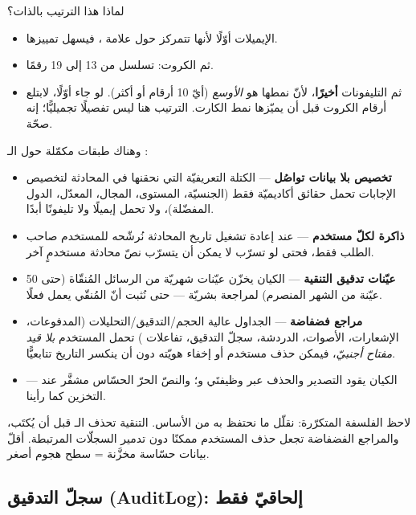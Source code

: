 لماذا هذا الترتيب بالذات؟
\begin{itemize}
\item الإيميلات أوّلًا لأنها تتمركز حول علامة ، فيسهل تمييزها.
\item ثم الكروت: تسلسل من 13 إلى 19 رقمًا.
\item ثم التليفونات \textbf{أخيرًا}، لأنّ نمطها هو \emph{الأوسع} (أيّ 10 أرقام أو
  أكثر). لو جاء أوّلًا، لابتلع أرقام الكروت قبل أن يميّزها نمط الكارت. الترتيب هنا
  ليس تفصيلًا تجميليًّا؛ إنه صحّة.
\end{itemize}

وهناك طبقات مكمّلة حول الـ :
\begin{itemize}
\item \textbf{تخصيص بلا بيانات تواصُل} — الكتلة التعريفيّة التي نحقنها في المحادثة
  لتخصيص الإجابات تحمل حقائق أكاديميّة فقط (الجنسيّة، المستوى، المجال، المعدّل، الدول
  المفضّلة)، ولا تحمل إيميلًا ولا تليفونًا أبدًا.
\item \textbf{ذاكرة  لكلّ مستخدم} — عند إعادة تشغيل تاريخ المحادثة نُرشّحه
  للمستخدم صاحب الطلب فقط، فحتى لو تسرّب  لا يمكن أن يتسرّب نصّ
  محادثة مستخدمٍ آخر.
\item \textbf{عيّنات تدقيق التنقية} — الكيان  يخزّن
  عيّنات شهريّة من الرسائل المُنقّاة (حتى 50 عيّنة من الشهر المنصرم) لمراجعة بشريّة —
  حتى نُثبت أنّ المُنقّي يعمل فعلًا.
\item \textbf{مراجع فضفاضة } — الجداول عالية الحجم/التدقيق/التحليلات
  (المدفوعات، الإشعارات، الأصوات، الدردشة، سجلّ التدقيق، تفاعلات ) تحمل
   المستخدم \emph{بلا قيد مفتاح أجنبيّ}، فيمكن حذف مستخدم أو إخفاء هويّته
  دون أن ينكسر التاريخ تتابعيًّا.
\item \textbf{} — الكيان  يقود التصدير والحذف عبر
  وظيفتَي  و؛ والنصّ الحرّ الحسّاس مشفَّر عند
  التخزين كما رأينا.
\end{itemize}

\begin{secnote}
لاحظ الفلسفة المتكرّرة: نقلّل ما نحتفظ به من الأساس. التنقية تحذف الـ  قبل
أن يُكتَب، والمراجع الفضفاضة تجعل حذف المستخدم ممكنًا دون تدمير السجلّات المرتبطة.
أقلّ بيانات حسّاسة مخزَّنة = سطح هجوم أصغر.
\end{secnote}

\subsection{سجلّ التدقيق (AuditLog): إلحاقيّ فقط}


